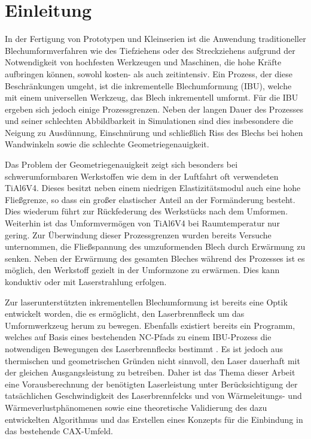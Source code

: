 \section{Einleitung}

In der Fertigung von Prototypen und Kleinserien ist die Anwendung traditioneller Blechumformverfahren wie des Tiefziehens oder des Streckziehens aufgrund der Notwendigkeit von hochfesten Werkzeugen und Maschinen, die hohe Kräfte aufbringen können, sowohl kosten- als auch zeitintensiv. Ein Prozess, der diese Beschränkungen umgeht, ist die inkrementelle Blechumformung (IBU), welche mit einem universellen Werkzeug, das Blech inkrementell umformt. Für die IBU ergeben sich jedoch einige Prozessgrenzen. Neben der langen Dauer des Prozesses und seiner schlechten Abbildbarkeit in Simulationen sind dies insbesondere die Neigung zu Ausdünnung, Einschnürung und schließlich Riss des Blechs bei hohen Wandwinkeln sowie die schlechte Geometriegenauigkeit. \cite{dissbambach,dissames}\par

Das Problem der Geometriegenauigkeit zeigt sich besonders bei schwerumformbaren Werkstoffen wie dem in der Luftfahrt oft verwendeten TiAl6V4. Dieses besitzt neben einem niedrigen Elastizitätsmodul auch eine hohe Fließgrenze, so dass ein großer elastischer Anteil an der Formänderung besteht. Dies wiederum führt zur Rückfederung des Werkstücks nach dem Umformen. Weiterhin ist das Umformvermögen von TiAl6V4 bei Raumtemperatur nur gering. Zur Überwindung dieser Prozessgrenzen wurden bereits Versuche unternommen, die Fließspannung des umzuformenden Blech durch Erwärmung zu senken. Neben der Erwärmung des gesamten Bleches während des Prozesses ist es möglich, den Werkstoff gezielt in der Umformzone zu erwärmen. Dies kann konduktiv oder mit Laserstrahlung erfolgen. \cite{hybridisf,diplbailly}\par

Zur laserunterstützten inkrementellen Blechumformung ist bereits eine Optik entwickelt worden, die es ermöglicht, den Laserbrennfleck um das Umformwerkzeug herum zu bewegen. Ebenfalls existiert bereits ein Programm, welches auf Basis eines bestehenden NC-Pfads zu einem IBU-Prozess die notwendigen Bewegungen des Laserbrennflecks bestimmt \cite{laseraisfti}. Es ist jedoch aus thermischen und geometrischen Gründen nicht sinnvoll, den Laser dauerhaft mit der gleichen Ausgangsleistung zu betreiben. Daher ist das Thema dieser Arbeit eine Vorausberechnung der benötigten Laserleistung unter Berücksichtigung der tatsächlichen Geschwindigkeit des Laserbrennfelcks und von Wärmeleitungs- und Wärmeverlustphänomenen sowie eine theoretische Validierung des dazu entwickelten Algorithmus und das Erstellen eines Konzepts für die Einbindung in das bestehende CAX-Umfeld.